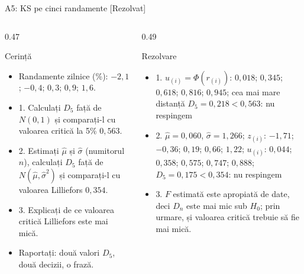 \begin{frame}{A5: KS pe cinci randamente [Rezolvat]}
\itemsize{\scriptsize}
\begin{columns}[T]
\begin{column}{0.47\textwidth}
\begin{block}{Cerință}
\begin{itemize}
    \item Randamente zilnice (\%): $-2{,}1$; $-0{,}4$; $0{,}3$; $0{,}9$; $1{,}6$.
    \item 1. Calculați $D_5$ față de $N(0, 1)$ și comparați-l cu valoarea critică la 5\% $0{,}563$.
    \item 2. Estimați $\hat\mu$ și $\hat\sigma$ (numitorul $n$), calculați $D_5$ față de $N(\hat\mu, \hat\sigma^2)$ și comparați-l cu valoarea Lilliefors $0{,}354$.
    \item 3. Explicați de ce valoarea critică Lilliefors este mai mică.
    \item Raportați: două valori $D_5$, două decizii, o frază.
\end{itemize}
\end{block}
\end{column}
\begin{column}{0.49\textwidth}
\begin{exampleblock}{Rezolvare}
\begin{itemize}
    \item 1. $u_{(i)} = \Phi(r_{(i)})$: $0{,}018$; $0{,}345$; $0{,}618$; $0{,}816$; $0{,}945$; cea mai mare distanță $D_5 = 0{,}218 < 0{,}563$: nu respingem
    \item 2. $\hat\mu = 0{,}060$, $\hat\sigma = 1{,}266$; $z_{(i)}$: $-1{,}71$; $-0{,}36$; $0{,}19$; $0{,}66$; $1{,}22$; $u_{(i)}$: $0{,}044$; $0{,}358$; $0{,}575$; $0{,}747$; $0{,}888$; $D_5 = 0{,}175 < 0{,}354$: nu respingem
    \item 3. $F$ estimată este apropiată de date, deci $D_n$ este mai mic sub $H_0$; prin urmare, și valoarea critică trebuie să fie mai mică.
\end{itemize}
\end{exampleblock}
\end{column}
\end{columns}
\end{frame}


